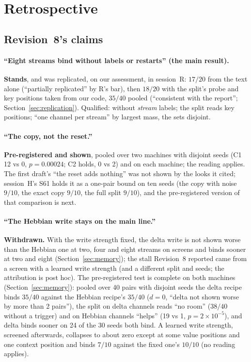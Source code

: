 \documentclass[11pt]{article}
\begin{document}
\section{Retrospective}
\label{sec:retro}

\subsection{Revision~8's claims}

\paragraph{``Eight streams bind without labels or restarts'' (the main result).} \textbf{Stands}, and was replicated, on our assessment, in session~R: $17/20$ from the text alone (``partially replicated'' by R's bar), then $18/20$ with the split's probe and key positions taken from our code, $35/40$ pooled (``consistent with the report''; Section~\ref{sec:replication}). Qualified: without \emph{stream} labels; the split reads key positions; ``one channel per stream'' by largest mass, the sets disjoint.

\paragraph{``The copy, not the reset.''} \textbf{Pre-registered and shown}, pooled over two machines with disjoint seeds (C1 12 vs 0, $p = 0.00024$; C2 holds, 0 vs 2) and on each machine; the reading applies. The first draft's ``the reset adds nothing'' was not shown by the looks it cited; session~H's S61 holds it as a one-pair bound on ten seeds (the copy with noise $9/10$, the exact copy $9/10$, the full split $9/10$), and the pre-registered version of that comparison is next.

\paragraph{``The Hebbian write stays on the main line.''} \textbf{Withdrawn.} With the write strength fixed, the delta write is not shown worse than the Hebbian one at two, four and eight streams on screens and binds sooner at two and eight (Section~\ref{sec:memory}); the stall Revision~8 reported came from a screen with a learned write strength (and a different split and seeds; the attribution is post hoc). The pre-registered test is complete on both machines (Section~\ref{sec:memory}): pooled over 40 pairs with disjoint seeds the delta recipe binds $35/40$ against the Hebbian recipe's $35/40$ ($d = 0$, ``delta not shown worse by more than 2 pairs''), the split on delta channels reads ``no room'' ($38/40$ without a trigger) and on Hebbian channels ``helps'' (19 vs 1, $p = 2\times10^{-5}$), and delta binds sooner on 24 of the 30 seeds both bind. A learned write strength, screened afterwards, collapses to about zero except at some value positions and one context position and binds $7/10$ against the fixed one's $10/10$ (no reading applies).
\end{document}
